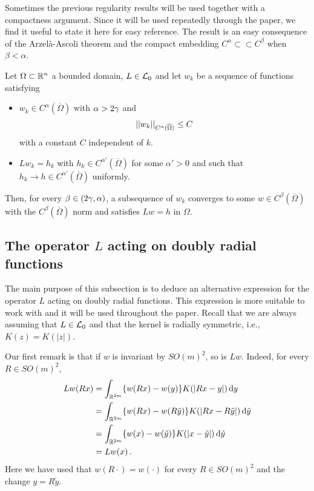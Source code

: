 Sometimes the previous regularity results will be used together with a compactness argument. Since it will be used repeatedly through the paper, we find it useful to state it here for easy reference. The result is an easy consequence of the Arzelà-Ascoli theorem and the compact embedding $C^\alpha \subset \subset C^\beta$ when $\beta < \alpha$.

\begin{lemma}
\label{Lemma:CompactnessLemma}
Let $\Omega\subset \mathbb{R}^n$ a bounded domain, $L\in \mathcal{L}_0$ and let $w_k$ be a sequence of functions satisfying
\begin{itemize}
\item $w_k \in C^\alpha (\overline{\Omega})$ with $\alpha > 2\gamma$ and 
$$
\left | \left |{w_k} \right | \right |_{C^\alpha (\overline{\Omega})} \leq C
$$
with a constant $C$ independent of $k$.
\item $L w_k = h_k$ with $h_k \in C^{\alpha'}(\overline{\Omega})$ for some $\alpha' > 0$ and such that $h_k \to h \in C^{\alpha'}(\overline{\Omega})$ uniformly.
\end{itemize}
Then, for every $\beta \in (2\gamma, \alpha)$, a subsequence of $w_k$ converges to some $w \in C^\beta (\overline{\Omega})$ with the $C^\beta (\overline{\Omega})$ norm and satisfies $Lw = h$ in $\Omega$.
\end{lemma}

\subsection{The operator $L$ acting on doubly radial functions}
The main purpose of this subsection is to deduce an alternative expression for the operator $L$ acting on doubly radial functions. This expression is more suitable to work with and it will be used throughout the paper. Recall that we are always assuming that $L\in \mathcal{L}_0$ and that the kernel is radially symmetric, i.e., $K(z) = K(|z|)$. 

Our first remark is that if $w$ is invariant by $SO(m)^2$, so is $Lw$. Indeed, for every $R \in SO(m)^2$, 
\begin{align*}
	Lw (Rx) 
	& = \int_{\mathbb{R}^{2m}} \{w(Rx) - w(y)\} K(|Rx - y|)  \,\mathrm{d} y\\
	& = \int_{\mathbb{R}^{2m}} \{w(Rx) - w(R\tilde{y})\} K(|Rx - R\tilde{y}|) \,\mathrm{d} \tilde{y}\\
	& = \int_{\mathbb{R}^{2m}} \{w(x) - w(\tilde{y})\} K(|x-\tilde{y}|) \,\mathrm{d} \tilde{y}\\
	& = Lw (x)\,.
\end{align*}
Here we have used that $w(R \cdot) = w(\cdot)$ for every $R\in SO(m)^2$ and the change $y = R\tilde{y}$. 


